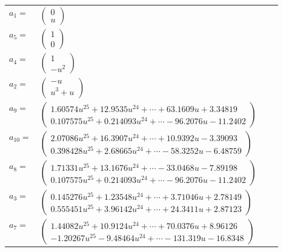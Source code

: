 \documentclass[1p]{elsarticle_modified}
\theoremstyle{definition}
\begin{document}
\begin{tabular}{m{7pt} m{180pt} m{7pt} m{180pt} }
\flushright $a_{1}=$&$\begin{pmatrix}0\\u\end{pmatrix}$ \\
\flushright $a_{5}=$&$\begin{pmatrix}1\\0\end{pmatrix}$ \\
\flushright $a_{4}=$&$\begin{pmatrix}1\\- u^2\end{pmatrix}$ \\
\flushright $a_{2}=$&$\begin{pmatrix}- u\\u^3+u\end{pmatrix}$ \\
\flushright $a_{9}=$&$\begin{pmatrix}1.60574 u^{25}+12.9535 u^{24}+\cdots+63.1609 u+3.34819\\0.107575 u^{25}+0.214093 u^{24}+\cdots-96.2076 u-11.2402\end{pmatrix}$ \\
\flushright $a_{10}=$&$\begin{pmatrix}2.07086 u^{25}+16.3907 u^{24}+\cdots+10.9392 u-3.39093\\0.398428 u^{25}+2.68665 u^{24}+\cdots-58.3252 u-6.48759\end{pmatrix}$ \\
\flushright $a_{8}=$&$\begin{pmatrix}1.71331 u^{25}+13.1676 u^{24}+\cdots-33.0468 u-7.89198\\0.107575 u^{25}+0.214093 u^{24}+\cdots-96.2076 u-11.2402\end{pmatrix}$ \\
\flushright $a_{3}=$&$\begin{pmatrix}0.145276 u^{25}+1.23548 u^{24}+\cdots+3.71046 u+2.78149\\0.555451 u^{25}+3.96142 u^{24}+\cdots+24.3411 u+2.87123\end{pmatrix}$ \\
\flushright $a_{7}=$&$\begin{pmatrix}1.44082 u^{25}+10.9124 u^{24}+\cdots+70.0376 u+8.96126\\-1.20267 u^{25}-9.48464 u^{24}+\cdots-131.319 u-16.8348\end{pmatrix}$ \\

\end{tabular}
\end{document}
